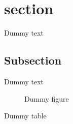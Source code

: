 \documentclass{article}
\begin{document}
\tableofcontents
\newpage

\section{section}

Dummy text

\subsection{Subsection}

Dummy text

\begin{figure}
	\caption{Dummy figure}
\end{figure}

\begin{table}
	\caption{Dummy table}
\end{table}

\begin{appendix}
	\listoffigures
	\listoftables
\end{appendix}
\end{document}
